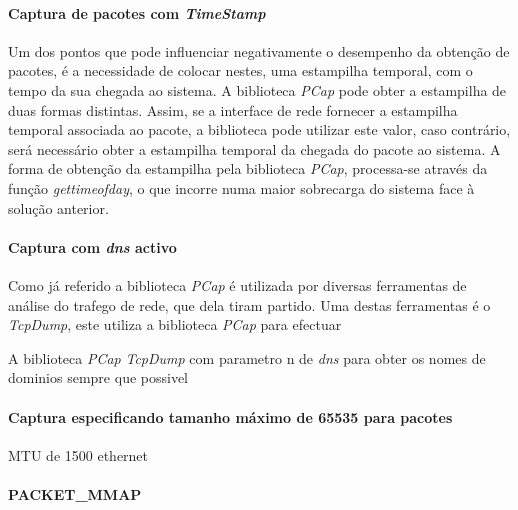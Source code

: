 \paragraph{Captura de pacotes com \textit{TimeStamp}}
Um dos pontos que pode influenciar negativamente o desempenho da obtenção de pacotes, é a necessidade de colocar nestes, uma estampilha temporal, com o tempo da sua chegada ao sistema.
A biblioteca \textit{PCap} pode obter a estampilha de duas formas distintas.
Assim, se a interface de rede fornecer a estampilha temporal associada ao pacote, a biblioteca pode utilizar este valor, caso contrário, será necessário obter a estampilha temporal da chegada do pacote ao sistema.
A forma de obtenção da estampilha pela biblioteca \textit{PCap}, processa-se através da função \textit{gettimeofday}, o que incorre numa maior sobrecarga do sistema face à solução anterior.

\paragraph{Captura com \textit{dns} activo}

Como já referido a biblioteca \textit{PCap} é utilizada por diversas ferramentas de análise do trafego de rede, que dela tiram partido.
Uma destas ferramentas é o \textit{TcpDump}, este utiliza a biblioteca \textit{PCap} para efectuar 

A biblioteca \textit{PCap}
\textit{TcpDump} com parametro n de \textit{dns} para obter os nomes de dominios sempre que possivel

\paragraph{Captura especificando tamanho máximo de 65535 para pacotes}

MTU de 1500 ethernet

\paragraph*{PACKET\_MMAP}

